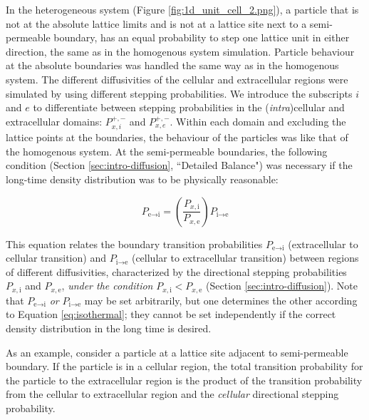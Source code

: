 	In the heterogeneous system (Figure \ref{fig:1d_unit_cell_2.png}), a particle that is not at the absolute lattice limits and is not at a lattice site next to a semi-permeable boundary, has an equal probability to step one lattice unit in either direction, the same as in the homogenous system simulation. Particle behaviour at the absolute boundaries was handled the same way as in the homogenous system. The different diffusivities of the cellular and extracellular regions were simulated by using different stepping probabilities. We introduce the subscripts $ i $ and $ e $ to differentiate between stepping probabilities in the (\textsl{intra})cellular and extracellular domains: $ P_{x,i}^{+,-} $ and $ P_{x,e}^{+,-} $. Within each domain and excluding the lattice points at the boundaries, the behaviour of the particles was like that of the homogenous system. At the semi-permeable boundaries, the following condition (Section \ref{sec:intro-diffusion}, ``Detailed Balance") was necessary if the long-time density distribution was to be physically reasonable:
	
	\begin{equation}
		\label{eq:isothermal}
		P_{\textrm{e}\rightarrow \textrm{i}} = \left( \dfrac{P_{x,\textrm{i}}}{P_{x,\textrm{e}}}\right)  P_{\textrm{i}\rightarrow \textrm{e}}
	\end{equation}
	
	This equation relates the boundary transition probabilities $ P_{\textrm{e} \rightarrow \textrm{i}} $ (extracellular to cellular transition) and $ P_{\textrm{i} \rightarrow \textrm{e}} $ (cellular to extracellular transition) between regions of different diffusivities, characterized by the directional stepping probabilities $ P_{x,\textrm{i}} $ and $ P_{x,\textrm{e}} $, \emph{under the condition} $ P_{x,\textrm{i}} < P_{x,\textrm{e}} $ (Section \ref{sec:intro-diffusion}). Note that $ P_{\textrm{e} \rightarrow \textrm{i}} $ \textsl{or} $ P_{\textrm{i} \rightarrow \textrm{e}} $ may be set arbitrarily, but one determines the other according to Equation \ref{eq:isothermal}; they cannot be set independently if the correct density distribution in the long time is desired. 
	
	As an example, consider a particle at a lattice site adjacent to semi-permeable boundary. If the particle is in a cellular region, the total transition probability for the particle to the extracellular region is the product of the transition probability from the cellular to extracellular region and the \textsl{cellular} directional stepping probability.
	
